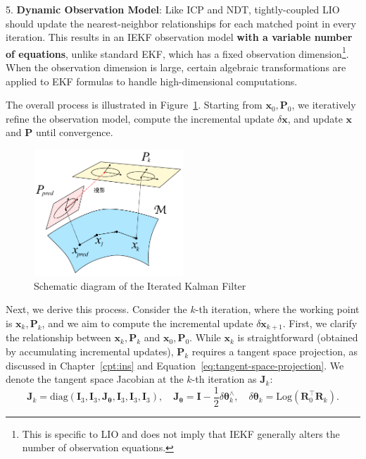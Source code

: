 5. \textbf{Dynamic Observation Model}: Like ICP and NDT, tightly-coupled LIO should update the nearest-neighbor relationships for each matched point in every iteration. This results in an IEKF observation model \textbf{with a variable number of equations}, unlike standard EKF, which has a fixed observation dimension\footnote{This is specific to LIO and does not imply that IEKF generally alters the number of observation equations.}. When the observation dimension is large, certain algebraic transformations are applied to EKF formulas to handle high-dimensional computations.  

The overall process is illustrated in Figure~\ref{fig:iekf-iters}. Starting from \(\mathbf{x}_0, \mathbf{P}_0\), we iteratively refine the observation model, compute the incremental update \(\delta \mathbf{x}\), and update \(\mathbf{x}\) and \(\mathbf{P}\) until convergence.  

\begin{figure}[!htp]  
	\centering  
	\includegraphics[width=0.5\textwidth]{resources/lio/iekf-iters.pdf}  
	\caption{Schematic diagram of the Iterated Kalman Filter}  
	\label{fig:iekf-iters}  
\end{figure}  

Next, we derive this process. Consider the \(k\)-th iteration, where the working point is \(\mathbf{x}_{k}, \mathbf{P}_{k}\), and we aim to compute the incremental update \(\delta \mathbf{x}_{k+1}\). First, we clarify the relationship between \(\mathbf{x}_{k}, \mathbf{P}_{k}\) and \(\mathbf{x}_0, \mathbf{P}_0\). While \(\mathbf{x}_{k}\) is straightforward (obtained by accumulating incremental updates), \(\mathbf{P}_{k}\) requires a tangent space projection, as discussed in Chapter~\ref{cpt:ins} and Equation~\eqref{eq:tangent-space-projection}. We denote the tangent space Jacobian at the \(k\)-th iteration as \(\mathbf{J}_k\):  
\begin{equation}\label{key}  
	\mathbf{J}_k = \mathrm{diag}(\mathbf{I}_3, \mathbf{I}_3, \mathbf{J}_{\boldsymbol{\theta}}, \mathbf{I}_3, \mathbf{I}_3, \mathbf{I}_3), \quad \mathbf{J}_{\boldsymbol{\theta}} = \mathbf{I} - \frac{1}{2} \delta \boldsymbol{\theta}_k^\wedge, \quad \delta \boldsymbol{\theta}_k = \mathrm{Log}(\mathbf{R}_0^\top \mathbf{R}_k).  
\end{equation}  

